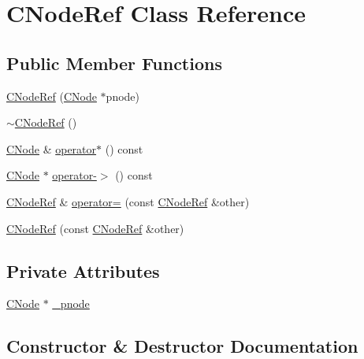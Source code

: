\hypertarget{class_c_node_ref}{}\section{C\+Node\+Ref Class Reference}
\label{class_c_node_ref}
\subsection*{Public Member Functions}
\begin{DoxyCompactItemize}
\item 
\mbox{\hyperlink{class_c_node_ref_ad22e7973b7525f45fa32ebd8416371b8}{C\+Node\+Ref}} (\mbox{\hyperlink{class_c_node}{C\+Node}} $\ast$pnode)
\item 
\mbox{\hyperlink{class_c_node_ref_accccc3e1c6fe461d4a74fb03588e15ad}{$\sim$\+C\+Node\+Ref}} ()
\item 
\mbox{\hyperlink{class_c_node}{C\+Node}} \& \mbox{\hyperlink{class_c_node_ref_a047417ee2d4c333d02877d196e3e93e0}{operator$\ast$}} () const
\item 
\mbox{\hyperlink{class_c_node}{C\+Node}} $\ast$ \mbox{\hyperlink{class_c_node_ref_a632d60ec3c8f5067175495f7e16792e4}{operator-\/$>$}} () const
\item 
\mbox{\hyperlink{class_c_node_ref}{C\+Node\+Ref}} \& \mbox{\hyperlink{class_c_node_ref_a317447d0593bd0257b7dedbd179031fb}{operator=}} (const \mbox{\hyperlink{class_c_node_ref}{C\+Node\+Ref}} \&other)
\item 
\mbox{\hyperlink{class_c_node_ref_a64fe9c5f4eb0c13548099cdaf8901819}{C\+Node\+Ref}} (const \mbox{\hyperlink{class_c_node_ref}{C\+Node\+Ref}} \&other)
\end{DoxyCompactItemize}
\subsection*{Private Attributes}
\begin{DoxyCompactItemize}
\item 
\mbox{\hyperlink{class_c_node}{C\+Node}} $\ast$ \mbox{\hyperlink{class_c_node_ref_a61a5998bc18a3aecd159d9786464480c}{\+\_\+pnode}}
\end{DoxyCompactItemize}


\subsection{Constructor \& Destructor Documentation}
\mbox{\label{class_c_node_ref_ad22e7973b7525f45fa32ebd8416371b8}} 
